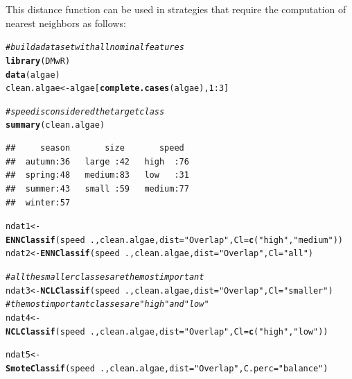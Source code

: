\documentclass[10pt,a4paper]{article}\usepackage[]{graphicx}\usepackage[]{color}
\makeatletter
\newcommand{\hlnum}[1]{\textcolor[rgb]{0.686,0.059,0.569}{#1}}%
\newcommand{\hlstr}[1]{\textcolor[rgb]{0.192,0.494,0.8}{#1}}%
\newcommand{\hlcom}[1]{\textcolor[rgb]{0.678,0.584,0.686}{\textit{#1}}}%
\newcommand{\hlopt}[1]{\textcolor[rgb]{0,0,0}{#1}}%
\newcommand{\hlstd}[1]{\textcolor[rgb]{0.345,0.345,0.345}{#1}}%
\newcommand{\hlkwb}[1]{\textcolor[rgb]{0.69,0.353,0.396}{#1}}%
\newcommand{\hlkwc}[1]{\textcolor[rgb]{0.333,0.667,0.333}{#1}}%
\newcommand{\hlkwd}[1]{\textcolor[rgb]{0.737,0.353,0.396}{\textbf{#1}}}%
\newenvironment{kframe}{%
 \def\at@end@of@kframe{}%
 \ifinner\ifhmode%
  \def\at@end@of@kframe{\end{minipage}}%
  \begin{minipage}{\columnwidth}%
 \fi\fi%
 \def\FrameCommand##1{\hskip\@totalleftmargin \hskip-\fboxsep
 \colorbox{shadecolor}{##1}\hskip-\fboxsep
     \hskip-\linewidth \hskip-\@totalleftmargin \hskip\columnwidth}%
 \MakeFramed {\advance\hsize-\width
   \@totalleftmargin\z@ \linewidth\hsize
   \@setminipage}}%
 {\par\unskip\endMakeFramed%
 \at@end@of@kframe}
\newenvironment{knitrout}{}{} %
\makeatother
\begin{document}
This distance function can be used in strategies that require the computation of nearest neighbors as follows:

\begin{knitrout}\footnotesize
{}\color{fgcolor}\begin{kframe}
\begin{alltt}
\hlcom{# build a data set with all nominal features}
\hlkwd{library}\hlstd{(DMwR)}
\hlkwd{data}\hlstd{(algae)}
\hlstd{clean.algae} \hlkwb{<-} \hlstd{algae[}\hlkwd{complete.cases}\hlstd{(algae),}\hlnum{1}\hlopt{:}\hlnum{3}\hlstd{]}

\hlcom{# speed is considered the target class}
\hlkwd{summary}\hlstd{(clean.algae)}
\end{alltt}
\begin{verbatim}
##     season       size       speed   
##  autumn:36   large :42   high  :76  
##  spring:48   medium:83   low   :31  
##  summer:43   small :59   medium:77  
##  winter:57
\end{verbatim}
\begin{alltt}
\hlstd{ndat1} \hlkwb{<-} \hlkwd{ENNClassif}\hlstd{(speed}\hlopt{~}\hlstd{., clean.algae,} \hlkwc{dist}\hlstd{=}\hlstr{"Overlap"}\hlstd{,}  \hlkwc{Cl}\hlstd{=}\hlkwd{c}\hlstd{(}\hlstr{"high"}\hlstd{,} \hlstr{"medium"}\hlstd{))}
\hlstd{ndat2} \hlkwb{<-} \hlkwd{ENNClassif}\hlstd{(speed}\hlopt{~}\hlstd{., clean.algae,} \hlkwc{dist}\hlstd{=}\hlstr{"Overlap"}\hlstd{,}  \hlkwc{Cl}\hlstd{=}\hlstr{"all"}\hlstd{)}

\hlcom{#all the smaller classes are the most important}
\hlstd{ndat3} \hlkwb{<-} \hlkwd{NCLClassif}\hlstd{(speed}\hlopt{~}\hlstd{., clean.algae,} \hlkwc{dist}\hlstd{=}\hlstr{"Overlap"}\hlstd{,}  \hlkwc{Cl}\hlstd{=}\hlstr{"smaller"}\hlstd{)}
\hlcom{# the most important classes are "high" and "low"}
\hlstd{ndat4} \hlkwb{<-} \hlkwd{NCLClassif}\hlstd{(speed}\hlopt{~}\hlstd{., clean.algae,} \hlkwc{dist}\hlstd{=}\hlstr{"Overlap"}\hlstd{,}  \hlkwc{Cl}\hlstd{=}\hlkwd{c}\hlstd{(}\hlstr{"high"}\hlstd{,} \hlstr{"low"}\hlstd{))}

\hlstd{ndat5} \hlkwb{<-} \hlkwd{SmoteClassif}\hlstd{(speed}\hlopt{~}\hlstd{., clean.algae,} \hlkwc{dist}\hlstd{=}\hlstr{"Overlap"}\hlstd{,} \hlkwc{C.perc}\hlstd{=}\hlstr{"balance"}\hlstd{)}
\end{alltt}
\end{kframe}
\end{knitrout}
\end{document}
